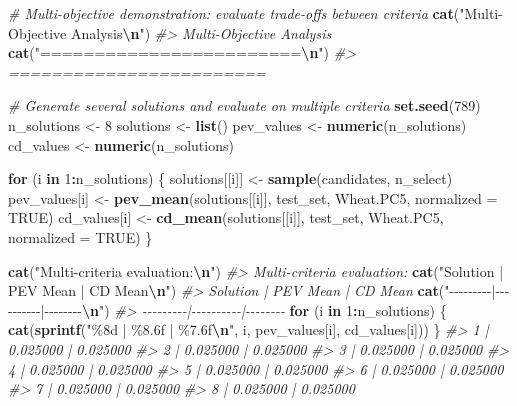 \documentclass[
]{article}
\newenvironment{Shaded}{\begin{snugshade}}{\end{snugshade}}
\newcommand{\AttributeTok}[1]{\textcolor[rgb]{0.13,0.29,0.53}{#1}}
\newcommand{\CommentTok}[1]{\textcolor[rgb]{0.56,0.35,0.01}{\textit{#1}}}
\newcommand{\ConstantTok}[1]{\textcolor[rgb]{0.56,0.35,0.01}{#1}}
\newcommand{\ControlFlowTok}[1]{\textcolor[rgb]{0.13,0.29,0.53}{\textbf{#1}}}
\newcommand{\DecValTok}[1]{\textcolor[rgb]{0.00,0.00,0.81}{#1}}
\newcommand{\FunctionTok}[1]{\textcolor[rgb]{0.13,0.29,0.53}{\textbf{#1}}}
\newcommand{\NormalTok}[1]{#1}
\newcommand{\OtherTok}[1]{\textcolor[rgb]{0.56,0.35,0.01}{#1}}
\newcommand{\SpecialCharTok}[1]{\textcolor[rgb]{0.81,0.36,0.00}{\textbf{#1}}}
\newcommand{\StringTok}[1]{\textcolor[rgb]{0.31,0.60,0.02}{#1}}
\begin{document}
\begin{Shaded}
\begin{Highlighting}[]
\CommentTok{\# Multi{-}objective demonstration: evaluate trade{-}offs between criteria}
\FunctionTok{cat}\NormalTok{(}\StringTok{"Multi{-}Objective Analysis}\SpecialCharTok{\textbackslash{}n}\StringTok{"}\NormalTok{)}
\CommentTok{\#\textgreater{} Multi{-}Objective Analysis}
\FunctionTok{cat}\NormalTok{(}\StringTok{"========================}\SpecialCharTok{\textbackslash{}n}\StringTok{"}\NormalTok{)}
\CommentTok{\#\textgreater{} ========================}

\CommentTok{\# Generate several solutions and evaluate on multiple criteria}
\FunctionTok{set.seed}\NormalTok{(}\DecValTok{789}\NormalTok{)}
\NormalTok{n\_solutions }\OtherTok{\textless{}{-}} \DecValTok{8}
\NormalTok{solutions }\OtherTok{\textless{}{-}} \FunctionTok{list}\NormalTok{()}
\NormalTok{pev\_values }\OtherTok{\textless{}{-}} \FunctionTok{numeric}\NormalTok{(n\_solutions)}
\NormalTok{cd\_values }\OtherTok{\textless{}{-}} \FunctionTok{numeric}\NormalTok{(n\_solutions)}

\ControlFlowTok{for}\NormalTok{ (i }\ControlFlowTok{in} \DecValTok{1}\SpecialCharTok{:}\NormalTok{n\_solutions) \{}
\NormalTok{  solutions[[i]] }\OtherTok{\textless{}{-}} \FunctionTok{sample}\NormalTok{(candidates, n\_select)}
\NormalTok{  pev\_values[i] }\OtherTok{\textless{}{-}} \FunctionTok{pev\_mean}\NormalTok{(solutions[[i]], test\_set, Wheat.PC5, }\AttributeTok{normalized =} \ConstantTok{TRUE}\NormalTok{)}
\NormalTok{  cd\_values[i] }\OtherTok{\textless{}{-}} \FunctionTok{cd\_mean}\NormalTok{(solutions[[i]], test\_set, Wheat.PC5, }\AttributeTok{normalized =} \ConstantTok{TRUE}\NormalTok{)}
\NormalTok{\}}

\FunctionTok{cat}\NormalTok{(}\StringTok{"Multi{-}criteria evaluation:}\SpecialCharTok{\textbackslash{}n}\StringTok{"}\NormalTok{)}
\CommentTok{\#\textgreater{} Multi{-}criteria evaluation:}
\FunctionTok{cat}\NormalTok{(}\StringTok{"Solution | PEV Mean | CD Mean}\SpecialCharTok{\textbackslash{}n}\StringTok{"}\NormalTok{)}
\CommentTok{\#\textgreater{} Solution | PEV Mean | CD Mean}
\FunctionTok{cat}\NormalTok{(}\StringTok{"{-}{-}{-}{-}{-}{-}{-}{-}{-}|{-}{-}{-}{-}{-}{-}{-}{-}{-}{-}|{-}{-}{-}{-}{-}{-}{-}{-}}\SpecialCharTok{\textbackslash{}n}\StringTok{"}\NormalTok{)}
\CommentTok{\#\textgreater{} {-}{-}{-}{-}{-}{-}{-}{-}{-}|{-}{-}{-}{-}{-}{-}{-}{-}{-}{-}|{-}{-}{-}{-}{-}{-}{-}{-}}
\ControlFlowTok{for}\NormalTok{ (i }\ControlFlowTok{in} \DecValTok{1}\SpecialCharTok{:}\NormalTok{n\_solutions) \{}
  \FunctionTok{cat}\NormalTok{(}\FunctionTok{sprintf}\NormalTok{(}\StringTok{"\%8d | \%8.6f | \%7.6f}\SpecialCharTok{\textbackslash{}n}\StringTok{"}\NormalTok{, i, pev\_values[i], cd\_values[i]))}
\NormalTok{\}}
\CommentTok{\#\textgreater{}        1 | 0.025000 | 0.025000}
\CommentTok{\#\textgreater{}        2 | 0.025000 | 0.025000}
\CommentTok{\#\textgreater{}        3 | 0.025000 | 0.025000}
\CommentTok{\#\textgreater{}        4 | 0.025000 | 0.025000}
\CommentTok{\#\textgreater{}        5 | 0.025000 | 0.025000}
\CommentTok{\#\textgreater{}        6 | 0.025000 | 0.025000}
\CommentTok{\#\textgreater{}        7 | 0.025000 | 0.025000}
\CommentTok{\#\textgreater{}        8 | 0.025000 | 0.025000}


\end{Highlighting}
\end{Shaded}
\end{document}

